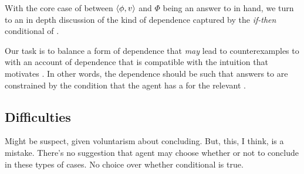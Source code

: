 \begin{note}
  With the core case of \support{} between \(\langle \phi, v \rangle\) and \(\Phi\) being an answer to \qWhyV{} in hand, we turn to an in depth discussion of the kind of dependence captured by the \emph{if-then} conditional of \qWhyV{}.

  Our task is to balance a form of dependence that \emph{may} lead to counterexamples to \issueInclusion{} with an account of dependence that is compatible with the intuition that motivates \issueInclusion{}.
  In other words, the dependence should be such that answers to \qWhyV{} are constrained by the condition that the agent has a \witness{} for the relevant \ros{}.
\end{note}

\subsection{Difficulties}
\label{sec:qwhyv-subs-paragr}

\begin{note}
  Might be suspect, given voluntarism about concluding.
  But, this, I think, is a mistake.
  There's no suggestion that agent may choose whether or not to conclude in these types of cases.
  No choice over whether conditional is true.
\end{note}

\subsection{\citeauthor{Owens:2006tw}}

